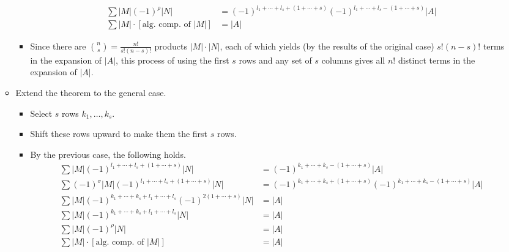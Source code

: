 \documentclass[titlepage]{article}
\newcounter{theorem}
\numberwithin{figure}{section}
\numberwithin{equation}{section}
\numberwithin{theorem}{section}
\begin{document}
\begin{itemize}
\begin{itemize}
\begin{itemize}
\begin{align*}
                \sum |M|(-1)^\rho|N| &= (-1)^{l_1+\cdots+l_s+(1+\cdots+s)}(-1)^{l_1+\cdots+l_s-(1+\cdots+s)}|A|\\
                \sum |M|\cdot[\text{alg. comp. of }|M|] &= |A|
            \end{align*}
            \item Since there are ${n\choose s}=\frac{n!}{s!(n-s)!}$ products $|M|\cdot|N|$, each of which yields (by the results of the original case) $s!(n-s)!$ terms in the expansion of $|A|$, this process of using the first $s$ rows and any set of $s$ columns gives all $n!$ distinct terms in the expansion of $|A|$.
        \end{itemize}
        \item Extend the theorem to the general case.
        \begin{itemize}
            \item Select $s$ rows $k_1,\dots,k_s$.
            \item Shift these rows upward to make them the first $s$ rows.
            \item By the previous case, the following holds.
            \begin{align*}
                \sum |M|(-1)^{l_1+\cdots+l_s+(1+\cdots+s)}|N| &= (-1)^{k_1+\cdots+k_s-(1+\cdots+s)}|A|\\
                \sum (-1)^\sigma|M|(-1)^{l_1+\cdots+l_s+(1+\cdots+s)}|N| &= (-1)^{k_1+\cdots+k_s+(1+\cdots+s)}(-1)^{k_1+\cdots+k_s-(1+\cdots+s)}|A|\\
                \sum |M|(-1)^{k_1+\cdots+k_s+l_1+\cdots+l_s}(-1)^{2(1+\cdots+s)}|N| &= |A|\\
                \sum |M|(-1)^{k_1+\cdots+k_s+l_1+\cdots+l_s}|N| &= |A|\\
                \sum |M|(-1)^\rho|N| &= |A|\\
                \sum |M|\cdot[\text{alg. comp. of }|M|] &= |A|
            \end{align*}
        \end{itemize}
    \end{itemize}
\end{itemize}
\end{document}
